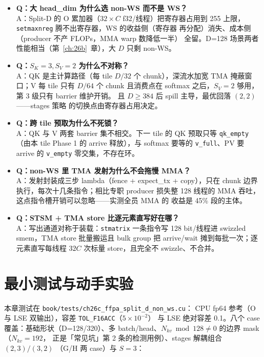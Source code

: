 \begin{itemize}[itemsep=1pt]
  \item \textbf{Q：大 head\_dim 为什么选 non-WS 而不是 WS？}\\
        A：Split-D 的 O 累加器（$32{\times}C$ f32/线程）把寄存器占用到
        255 上限，\texttt{setmaxnreg} 腾不出寄存器，WS 的收益侧（寄存器
        再分配）消失、成本侧（producer 不产 FLOPs，MMA warp 数降低一半）
        全留。D=128 场景两者性能相当（第~\ref{ch:26b}~章），大 $D$
        只剩 non-WS。
  \item \textbf{Q：$S_K{=}3,S_V{=}2$ 为什么不对称？}\\
        A：QK 是主计算路径（每 tile $D/32$ 个 chunk），深流水加宽
        TMA 掩蔽窗口；V 每 tile 只有 $D/64$ 个 chunk 且消费点在
        softmax 之后，$S_V{=}2$ 够用，第 3 级只有 barrier 维护开销。
        且 $D\ge384$ 后 spill 主导，最优回落 $(2,2)$——stages 策略
        的切换点由寄存器占用决定。
  \item \textbf{Q：跨 tile 预取为什么不死锁？}\\
        A：QK 与 V 两套 barrier 集不相交。下一 tile 的 QK 预取只等
        \texttt{qk\_empty}（由本 tile Phase 1 的 arrive 释放），与
        softmax 要等的 \texttt{v\_full}、PV 要 arrive 的
        \texttt{v\_empty} 零交集，不存在环。
  \item \textbf{Q：non-WS 里 TMA 发射为什么不会拖慢 MMA？}\\
        A：发射封装成三步 lambda（fence + expect\_tx + copy），只在
        chunk 边界执行，每次十几条指令；相比专职 producer 损失整 128
        线程的 MMA 吞吐，这点指令槽开销可以忽略——实测全员 MMA 的
        收益是 45\% 段的主体。
  \item \textbf{Q：STSM + TMA store 比逐元素直写好在哪？}\\
        A：写出通道对称于装载：\texttt{stmatrix} 一条指令写
        128 bit/线程进 swizzled smem，TMA store 批量搬运且 bulk
        group 把 arrive/wait 摊到每批一次；逐元素直写每线程 $32C$
        次标量 store，且完全不 swizzle、不合并。
\end{itemize}

\section{最小测试与动手实验}\label{sec:26c-test}

本章测试在 \texttt{book/tests/ch26c\_\allowbreak{}ffpa\_\allowbreak{}split\_\allowbreak{}d\_\allowbreak{}non\_ws.cu}：
CPU fp64 参考（O 与 LSE 双输出），容差 \texttt{TOL\_F16ACC}（$5\times10^{-2}$）
与 LSE 绝对容差 0.1。八个 case 覆盖：基础形状（D=128/320）、多
batch/head、$N_{kv} \bmod 128 \ne 0$ 的边界 mask（$N_{kv}{=}192$，
正是「常见坑」第 2 条的检测用例）、stages 解耦组合 $(2,3)/(3,2)$
（G/H 两 case）与 $S{=}3$：

